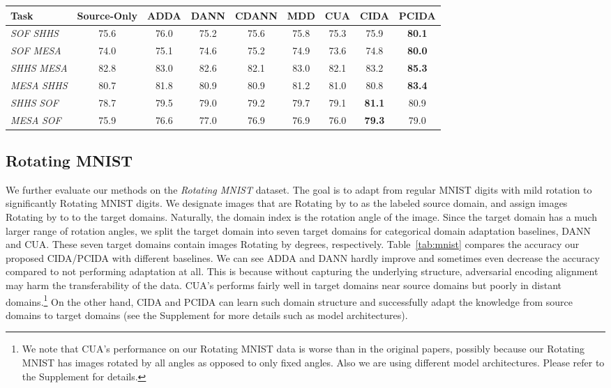 \documentclass{article}
\newcommand{\tabref}[1]{Table~\ref{#1}}
\begin{document}
\begin{table*}[t]
\begin{footnotesize}
\begin{center}
\vspace{1mm}
\begin{tabular}{lcccccccc}
\hline
Task  & Source-Only  & ADDA & DANN & CDANN & MDD & CUA & CIDA & PCIDA \\
\hline
 \emph{SOF}  \emph{SHHS}
 & 75.6 & {76.0} & 75.2 & 75.6 & 75.8 & 75.3 & 75.9 & \textbf{80.1}  \\
  \emph{SOF}  \emph{MESA}
 & 74.0 & 75.1 & 74.6 & {75.2} & 74.9 & 73.6 & 74.8 & \textbf{80.0}  \\
  \emph{SHHS}  \emph{MESA}
 & 82.8& 83.0 & 82.6 & 82.1 & 83.0 & 82.1 & {83.2} & \textbf{85.3}  \\
  \emph{MESA}  \emph{SHHS}
 & 80.7 & {81.8} & 80.9 & 80.9 & 81.2 & 81.0 & 80.8 & \textbf{83.4}  \\
 \emph{SHHS}  \emph{SOF}
 & 78.7 & 79.5 & 79.0 & 79.2 & 79.7 & 79.1 & \textbf{81.1} & {80.9}  \\
 \emph{MESA}  \emph{SOF}
 & 75.9 & 76.6 & 77.0 & 76.9 & 76.9 & 76.0 & \textbf{79.3} & {79.0}  \\
 \hline
\end{tabular}
\end{center}
\vskip -0.7cm
\end{footnotesize}
\end{table*}


\subsection{Rotating MNIST}
We further evaluate our methods on the \emph{Rotating MNIST} dataset. The goal is to adapt from regular MNIST digits with mild rotation to significantly Rotating MNIST digits. We designate images that are Rotating by  to  as the labeled source domain, and assign images Rotating by  to  to the target domains. Naturally, the domain index is the rotation angle of the image. Since the target domain has a much larger range of rotation angles, we split the target domain into seven target domains for categorical domain adaptation baselines, DANN and CUA. These seven target domains contain images Rotating by  degrees, respectively. \tabref{tab:mnist} compares the accuracy our proposed CIDA/PCIDA with different baselines.
We can see ADDA and DANN hardly improve and sometimes even decrease the accuracy compared to not performing adaptation at all. This is because without capturing the underlying structure, adversarial encoding alignment may harm the transferability of the data. CUA's performs fairly well in target domains near source domains but poorly in distant domains.\footnote{We note that CUA's performance on our Rotating MNIST data is worse than in the original papers, possibly because our Rotating MNIST has images rotated by all angles as opposed to only  fixed angles. Also we are using different model architectures. Please refer to the Supplement for details.} On the other hand, CIDA and PCIDA can learn such domain structure and successfully adapt the knowledge from source domains to target domains (see the Supplement for more details such as model architectures).
\end{document}
